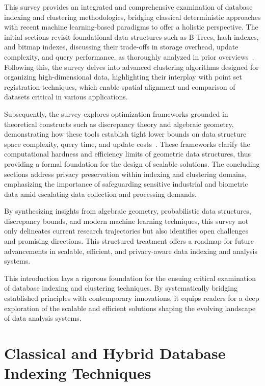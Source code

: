 \documentclass[sigconf]{acmart}
\begin{document}
This survey provides an integrated and comprehensive examination of database indexing and clustering methodologies, bridging classical deterministic approaches with recent machine learning-based paradigms to offer a holistic perspective. The initial sections revisit foundational data structures such as B-Trees, hash indexes, and bitmap indexes, discussing their trade-offs in storage overhead, update complexity, and query performance, as thoroughly analyzed in prior overviews~\cite{ref31}. Following this, the survey delves into advanced clustering algorithms designed for organizing high-dimensional data, highlighting their interplay with point set registration techniques, which enable spatial alignment and comparison of datasets critical in various applications.

Subsequently, the survey explores optimization frameworks grounded in theoretical constructs such as discrepancy theory and algebraic geometry, demonstrating how these tools establish tight lower bounds on data structure space complexity, query time, and update costs~\cite{ref1,ref2,ref3}. These frameworks clarify the computational hardness and efficiency limits of geometric data structures, thus providing a formal foundation for the design of scalable solutions. The concluding sections address privacy preservation within indexing and clustering domains, emphasizing the importance of safeguarding sensitive industrial and biometric data amid escalating data collection and processing demands.

By synthesizing insights from algebraic geometry, probabilistic data structures, discrepancy bounds, and modern machine learning techniques, this survey not only delineates current research trajectories but also identifies open challenges and promising directions. This structured treatment offers a roadmap for future advancements in scalable, efficient, and privacy-aware data indexing and analysis systems.

This introduction lays a rigorous foundation for the ensuing critical examination of database indexing and clustering techniques. By systematically bridging established principles with contemporary innovations, it equips readers for a deep exploration of the scalable and efficient solutions shaping the evolving landscape of data analysis systems.

\section{Classical and Hybrid Database Indexing Techniques}
\end{document}

